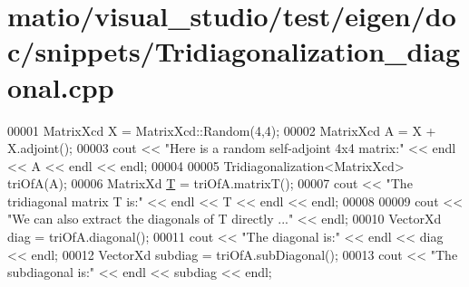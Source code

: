 \hypertarget{matio_2visual__studio_2test_2eigen_2doc_2snippets_2_tridiagonalization__diagonal_8cpp_source}{}\section{matio/visual\+\_\+studio/test/eigen/doc/snippets/\+Tridiagonalization\+\_\+diagonal.cpp}
\label{matio_2visual__studio_2test_2eigen_2doc_2snippets_2_tridiagonalization__diagonal_8cpp_source}

\begin{DoxyCode}
00001 MatrixXcd X = MatrixXcd::Random(4,4);
00002 MatrixXcd A = X + X.adjoint();
00003 cout << \textcolor{stringliteral}{"Here is a random self-adjoint 4x4 matrix:"} << endl << A << endl << endl;
00004 
00005 Tridiagonalization<MatrixXcd> triOfA(A);
00006 MatrixXd \hyperlink{group___sparse_core___module_class_eigen_1_1_triplet}{T} = triOfA.matrixT();
00007 cout << \textcolor{stringliteral}{"The tridiagonal matrix T is:"} << endl << T << endl << endl;
00008 
00009 cout << \textcolor{stringliteral}{"We can also extract the diagonals of T directly ..."} << endl;
00010 VectorXd diag = triOfA.diagonal();
00011 cout << \textcolor{stringliteral}{"The diagonal is:"} << endl << diag << endl; 
00012 VectorXd subdiag = triOfA.subDiagonal();
00013 cout << \textcolor{stringliteral}{"The subdiagonal is:"} << endl << subdiag << endl;
\end{DoxyCode}
